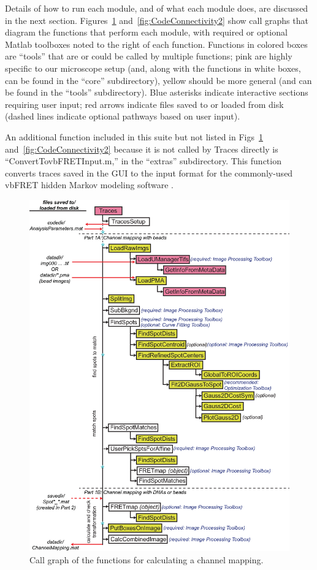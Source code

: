 \documentclass[11pt]{article}
\begin{document}
Details of how to run each module, and of what each module does, are discussed in the next section.  Figures~\ref{fig:CodeConnectivity1} and~\ref{fig:CodeConnectivity2} show call graphs that diagram the functions that perform each module, with required or optional Matlab toolboxes noted to the right of each function. Functions in colored boxes are ``tools'' that are or could be called by multiple functions; pink are highly specific to our microscope setup (and, along with the functions in white boxes, can be found in the ``core'' subdirectory), yellow should be more general (and can be found in the ``tools'' subdirectory).  Blue asterisks indicate interactive sections requiring user input; red arrows indicate files saved to or loaded from disk (dashed lines indicate optional pathways based on user input).

An additional function included in this suite but not listed in Figs~\ref{fig:CodeConnectivity1} and~\ref{fig:CodeConnectivity2} because it is not called by Traces directly is ``ConvertTovbFRETInput.m,'' in the ``extras'' subdirectory. This function converts traces saved in the GUI to the input format for the commonly-used vbFRET hidden Markov modeling software \cite{Bronson2009}.  

\begin{figure}[!p]
\begin{center}
\includegraphics[width=6in]{TracesFlowchart.eps}
\caption{Call graph of the functions for calculating a channel mapping.}
\label{fig:CodeConnectivity1}
\end{center}
\end{figure}
\end{document}
